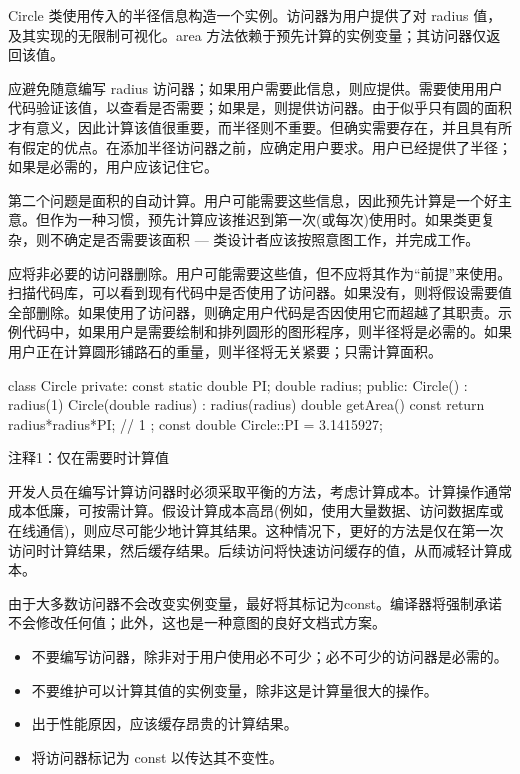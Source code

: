 Circle 类使用传入的半径信息构造一个实例。访问器为用户提供了对 radius 值，及其实现的无限制可视化。area 方法依赖于预先计算的实例变量；其访问器仅返回该值。

应避免随意编写 radius 访问器；如果用户需要此信息，则应提供。需要使用用户代码验证该值，以查看是否需要；如果是，则提供访问器。由于似乎只有圆的面积才有意义，因此计算该值很重要，而半径则不重要。但确实需要存在，并且具有所有假定的优点。在添加半径访问器之前，应确定用户要求。用户已经提供了半径；如果是必需的，用户应该记住它。

第二个问题是面积的自动计算。用户可能需要这些信息，因此预先计算是一个好主意。但作为一种习惯，预先计算应该推迟到第一次(或每次)使用时。如果类更复杂，则不确定是否需要该面积 — 类设计者应该按照意图工作，并完成工作。


应将非必要的访问器删除。用户可能需要这些值，但不应将其作为“前提”来使用。扫描代码库，可以看到现有代码中是否使用了访问器。如果没有，则将假设需要值全部删除。如果使用了访问器，则确定用户代码是否因使用它而超越了其职责。示例代码中，如果用户是需要绘制和排列圆形的图形程序，则半径将是必需的。如果用户正在计算圆形铺路石的重量，则半径将无关紧要；只需计算面积。


\begin{cpp}
class Circle {
private:
  const static double PI;
  double radius;
public:
  Circle() : radius(1) {}
  Circle(double radius) : radius(radius) {}
  double getArea() const { return radius*radius*PI; } // 1
};
const double Circle::PI = 3.1415927;
\end{cpp}

{\footnotesize
注释1：仅在需要时计算值
}

开发人员在编写计算访问器时必须采取平衡的方法，考虑计算成本。计算操作通常成本低廉，可按需计算。假设计算成本高昂(例如，使用大量数据、访问数据库或在线通信)，则应尽可能少地计算其结果。这种情况下，更好的方法是仅在第一次访问时计算结果，然后缓存结果。后续访问将快速访问缓存的值，从而减轻计算成本。

由于大多数访问器不会改变实例变量，最好将其标记为const。编译器将强制承诺不会修改任何值；此外，这也是一种意图的良好文档式方案。


\begin{itemize}
\item
不要编写访问器，除非对于用户使用必不可少；必不可少的访问器是必需的。

\item
不要维护可以计算其值的实例变量，除非这是计算量很大的操作。

\item
出于性能原因，应该缓存昂贵的计算结果。

\item
将访问器标记为 const 以传达其不变性。
\end{itemize}











